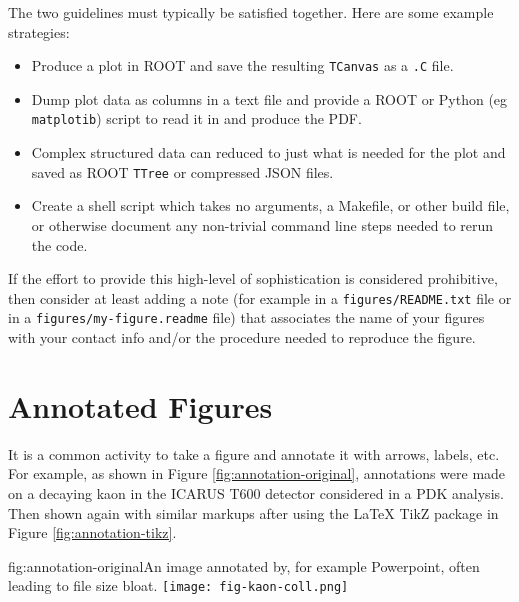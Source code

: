 The two guidelines must typically be satisfied together.  Here are
some example strategies:

\begin{itemize}
\item Produce a plot in ROOT and save the resulting \texttt{TCanvas}
  as a \texttt{.C} file.
\item Dump plot data as columns in a text file and provide a ROOT or
  Python (eg \texttt{matplotib}) script to read it in and produce the
  PDF.
\item Complex structured data can reduced to just what is needed for
  the plot and saved as ROOT \texttt{TTree} or compressed JSON files.
\item Create a shell script which takes no arguments, a Makefile, or
  other build file, or otherwise document any non-trivial command line
  steps needed to rerun the code.
\end{itemize}

If the effort to provide this high-level of sophistication is
considered prohibitive, then consider at least adding a note (for
example in a \texttt{figures/README.txt} file or in a
\texttt{figures/my-figure.readme} file) that associates the name of
your figures with your contact info and/or the procedure needed to
reproduce the figure.

\section{Annotated Figures}
\label{sec:graphic-annotate}

It is a common activity to take a figure and annotate it with arrows, labels, etc.
For example, as shown in Figure \ref{fig:annotation-original}, annotations were made on a decaying kaon in the ICARUS T600 detector
considered in a PDK analysis. Then shown again with similar markups after using the \LaTeX{} TikZ package in Figure \ref{fig:annotation-tikz}.

\begin{dunefigure}{fig:annotation-original}{An image annotated by, for example Powerpoint, often leading to file size bloat.}
\texttt{[image: fig-kaon-coll.png]}
\end{dunefigure}

